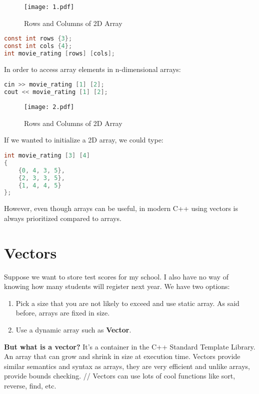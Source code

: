 \begin{figure}[h]
\centering
\texttt{[image: 1.pdf]}
\caption{\label{fig:1}Rows and Columns of 2D Array}
\end{figure}

\begin{mdframed}
\begin{lstlisting}[language=c]
const int rows {3};
const int cols {4};
int movie_rating [rows] [cols];
\end{lstlisting}
\end{mdframed}
In order to access array elements in n-dimensional arrays:
\begin{mdframed}
\begin{lstlisting}[language=c]
cin >> movie_rating [1] [2];
cout << movie_rating [1] [2];
\end{lstlisting}
\end{mdframed}

\begin{figure}[h]
\centering
\texttt{[image: 2.pdf]}
\caption{\label{fig:2}Rows and Columns of 2D Array}
\end{figure}
If we wanted to initialize a 2D array, we could type:
\begin{mdframed}
\begin{lstlisting}[language=c]
int movie_rating [3] [4]
{
    {0, 4, 3, 5},
    {2, 3, 3, 5},
    {1, 4, 4, 5}
};
\end{lstlisting}
\end{mdframed}
However, even though arrays can be useful, in modern C++ using vectors is always prioritized compared to arrays. 
\section{Vectors}
Suppose we want to store test scores for my school. I also have no way of knowing how many students will register next year. 
We have two options: 
\begin{enumerate}
    \item Pick a size that you are not likely to exceed and use static array. As said before, arrays are fixed in size.
    \item Use a dynamic array such as \textbf{Vector}.
\end{enumerate}
\textbf{But what is a vector?}
It's a container in the C++ Standard Template Library. An array that can grow and shrink in size at execution time. Vectors provide similar semantics and syntax as arrays, they are very efficient and unlike arrays, provide bounds checking. //
Vectors can use lots of cool functions like sort, reverse, find, etc.
